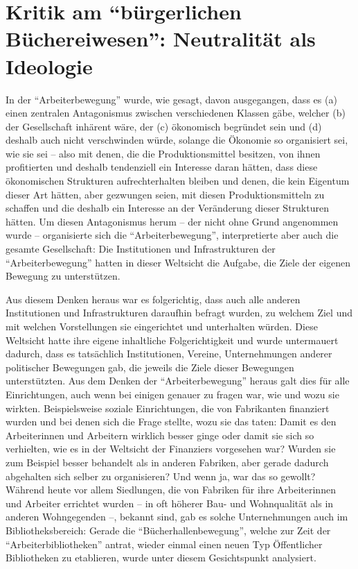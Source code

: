 \documentclass[a4paper,
fontsize=11pt,
oneside,
numbers=noperiodatend,
parskip=half-,
bibliography=totoc,
final
]{scrartcl}
\begin{document}
\hypertarget{kritik-am-buxfcrgerlichen-buxfcchereiwesen-neutralituxe4t-als-ideologie}{%
\section*{\texorpdfstring{Kritik am \enquote{bürgerlichen
Büchereiwesen}: Neutralität als
Ideologie}{Kritik am ``bürgerlichen Büchereiwesen'': Neutralität als Ideologie}}\label{kritik-am-buxfcrgerlichen-buxfcchereiwesen-neutralituxe4t-als-ideologie}}

In der \enquote{Arbeiterbewegung} wurde, wie gesagt, davon ausgegangen,
dass es (a) einen zentralen Antagonismus zwischen verschiedenen Klassen
gäbe, welcher (b) der Gesellschaft inhärent wäre, der (c) ökonomisch
begründet sein und (d) deshalb auch nicht verschwinden würde, solange
die Ökonomie so organisiert sei, wie sie sei -- also mit denen, die die
Produktionsmittel besitzen, von ihnen profitierten und deshalb
tendenziell ein Interesse daran hätten, dass diese ökonomischen
Strukturen aufrechterhalten bleiben und denen, die kein Eigentum dieser
Art hätten, aber gezwungen seien, mit diesen Produktionsmitteln zu
schaffen und die deshalb ein Interesse an der Veränderung dieser
Strukturen hätten. Um diesen Antagonismus herum -- der nicht ohne Grund
angenommen wurde -- organisierte sich die \enquote{Arbeiterbewegung},
interpretierte aber auch die gesamte Gesellschaft: Die Institutionen und
Infrastrukturen der \enquote{Arbeiterbewegung} hatten in dieser
Weltsicht die Aufgabe, die Ziele der eigenen Bewegung zu unterstützen.

Aus diesem Denken heraus war es folgerichtig, dass auch alle anderen
Institutionen und Infrastrukturen daraufhin befragt wurden, zu welchem
Ziel und mit welchen Vorstellungen sie eingerichtet und unterhalten
würden. Diese Weltsicht hatte ihre eigene inhaltliche Folgerichtigkeit
und wurde untermauert dadurch, dass es tatsächlich Institutionen,
Vereine, Unternehmungen anderer politischer Bewegungen gab, die jeweils
die Ziele dieser Bewegungen unterstützten. Aus dem Denken der
\enquote{Arbeiterbewegung} heraus galt dies für alle Einrichtungen, auch
wenn bei einigen genauer zu fragen war, wie und wozu sie wirkten.
Beispielsweise soziale Einrichtungen, die von Fabrikanten finanziert
wurden und bei denen sich die Frage stellte, wozu sie das taten: Damit
es den Arbeiterinnen und Arbeitern wirklich besser ginge oder damit sie
sich so verhielten, wie es in der Weltsicht der Finanziers vorgesehen
war? Wurden sie zum Beispiel besser behandelt als in anderen Fabriken,
aber gerade dadurch abgehalten sich selber zu organisieren? Und wenn ja,
war das so gewollt? Während heute vor allem Siedlungen, die von Fabriken
für ihre Arbeiterinnen und Arbeiter errichtet wurden -- in oft höherer
Bau- und Wohnqualität als in anderen Wohngegenden --, bekannt sind, gab
es solche Unternehmungen auch im Bibliotheksbereich: Gerade die
\enquote{Bücherhallenbewegung}, welche zur Zeit der
\enquote{Arbeiterbibliotheken} antrat, wieder einmal einen neuen Typ
Öffentlicher Bibliotheken zu etablieren, wurde unter diesem
Gesichtspunkt analysiert.
\end{document}
